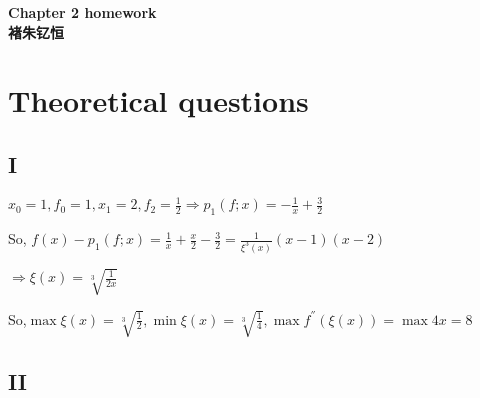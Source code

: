 \documentclass[12]{article}%
\begin{document}
\begin{center}
    \LARGE\songti\textbf{Chapter 2 homework} \\%
    \large\kaishu\textbf{褚朱钇恒}%
\end{center}
    \section{Theoretical questions}
        \subsection{I}
            $x_0=1,f_0=1,x_1=2,f_2=\frac{1}{2} \Rightarrow p_1(f;x)=-\frac{1}{x}+\frac{3}{2}$

            So, $f(x)-p_1(f;x)=\frac{1}{x}+\frac{x}{2}-\frac{3}{2}=\frac{1}{\xi^3(x)}(x-1)(x-2)$

            $\Rightarrow \xi(x)=\sqrt[3]{\frac{1}{2x}}$

            So,$\max \xi(x)=\sqrt[3]{\frac{1}{2}},\min \xi(x)=\sqrt[3]{\frac{1}{4}},\max f^{''}(\xi(x))=\max 4x=8$

        \subsection{II}
            
\end{document}
